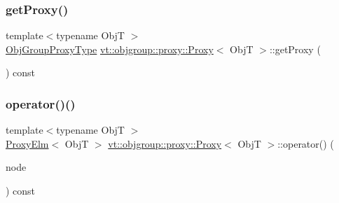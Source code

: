 \mbox{\label{structvt_1_1objgroup_1_1proxy_1_1_proxy_a76cda2351cf7801abe2ebffa1403c5b8}} 
\subsubsection{\texorpdfstring{get\+Proxy()}{getProxy()}}
{\footnotesize\ttfamily template$<$typename ObjT $>$ \\
\hyperlink{namespacevt_ad7cae989df485fccca57f0792a880a8e}{Obj\+Group\+Proxy\+Type} \hyperlink{structvt_1_1objgroup_1_1proxy_1_1_proxy}{vt\+::objgroup\+::proxy\+::\+Proxy}$<$ ObjT $>$\+::get\+Proxy (\begin{DoxyParamCaption}{ }\end{DoxyParamCaption}) const}

\mbox{\label{structvt_1_1objgroup_1_1proxy_1_1_proxy_ac290e4d37f05dc1183c205a1b9ee44cd}} 
\subsubsection{\texorpdfstring{operator()()}{operator()()}}
{\footnotesize\ttfamily template$<$typename ObjT $>$ \\
\hyperlink{structvt_1_1objgroup_1_1proxy_1_1_proxy_elm}{Proxy\+Elm}$<$ ObjT $>$ \hyperlink{structvt_1_1objgroup_1_1proxy_1_1_proxy}{vt\+::objgroup\+::proxy\+::\+Proxy}$<$ ObjT $>$\+::operator() (\begin{DoxyParamCaption}\item[{\hyperlink{namespacevt_a866da9d0efc19c0a1ce79e9e492f47e2}{Node\+Type}}]{node }\end{DoxyParamCaption}) const}

\mbox{\label{structvt_1_1objgroup_1_1proxy_1_1_proxy_a2fb8dafa11b8c8f70888118bdc2f1b60}} 
